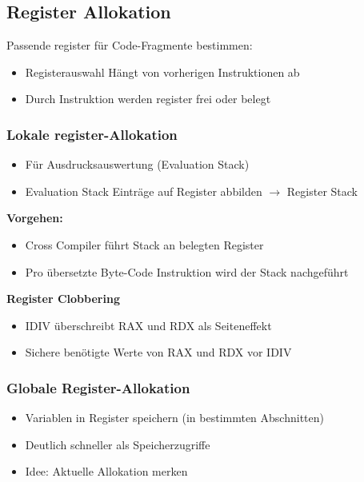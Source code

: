 \subsection{Register Allokation}
Passende register für Code-Fragmente bestimmen:
\begin{itemize}[topsep=0pt]
    \itemsep -0.2em
    \item Registerauswahl Hängt von vorherigen Instruktionen ab
    \item Durch Instruktion werden register frei oder belegt
\end{itemize}

\subsubsection{Lokale register-Allokation}
\begin{itemize}[topsep=0pt]
    \itemsep -0.2em
    \item Für Ausdrucksauswertung (Evaluation Stack)
    \item Evaluation Stack Einträge auf Register abbilden $\rightarrow$ Register Stack
\end{itemize}

\textbf{Vorgehen:}
\begin{itemize}[topsep=0pt]
    \itemsep -0.2em
    \item Cross Compiler führt Stack an belegten Register
    \item Pro übersetzte Byte-Code Instruktion wird der Stack nachgeführt
\end{itemize}

\textbf{Register Clobbering}
\begin{itemize}[topsep=0pt]
    \itemsep -0.2em
    \item IDIV überschreibt RAX und RDX als Seiteneffekt
    \item Sichere benötigte Werte von RAX und RDX vor IDIV
\end{itemize}

\subsubsection{Globale Register-Allokation}
\begin{itemize}[topsep=0pt]
    \itemsep -0.2em
    \item Variablen in Register speichern (in bestimmten Abschnitten)
    \item Deutlich schneller als Speicherzugriffe
    \item Idee: Aktuelle Allokation merken
\end{itemize}

